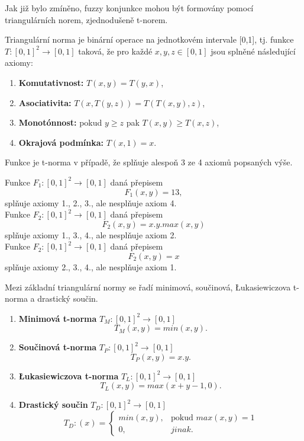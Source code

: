 Jak již bylo zmíněno, fuzzy konjunkce mohou být formovány pomocí triangulárních norem, zjednodušeně t-norem. 
\begin{definition}
\cite{hlinena}
    Triangulární norma je binární operace na jednotkovém intervale [0,1], tj. funkce $T: [0,1]^2 \rightarrow [0,1]$ taková, že pro každé $x, y, z \in [0,1]$ jsou splněné následující axiomy:
    \begin{enumerate}
        \item \textbf{Komutativnost:} $T(x,y) = T(y,x)$,
        \item \textbf{Asociativita:} $T(x, T(y, z)) = T(T(x, y), z)$,
        \item \textbf{Monotónnost:} pokud $y \geq z$ pak $T(x, y) \geq T(x, z)$,
        \item \textbf{Okrajová podmínka:} $T(x, 1) = x$.
    \end{enumerate}
\end{definition}

\begin{remark}
    Funkce je t-norma v případě, že spl\v nuje alespo\v n 3 ze 4 axiom\r u popsaných výše.
\end{remark}

\begin{example}
    Funkce $F_1 : [0, 1]^2 \rightarrow [0, 1]$ daná přepisem\\
    $$F_1(x,y) = 13,$$
    spl\v nuje axiomy 1., 2., 3., ale nespl\v nuje axiom 4.\\

    Funkce $F_2 : [0, 1]^2 \rightarrow [0, 1]$ daná přepisem\\
    $$F_2(x,y) = x.y.max(x,y)$$
    spl\v nuje axiomy 1., 3., 4., ale nespl\v nuje axiom 2.\\

    Funkce $F_2 : [0, 1]^2 \rightarrow [0, 1]$ daná přepisem\\
    $$F_2(x,y) = x$$
    spl\v nuje axiomy 2., 3., 4., ale nespl\v nuje axiom 1.\\
    
\end{example}

Mezi základní triangulární normy se řadí minimová, součinová, Łukasiewiczova t-norma a drastický součin.
\begin{definition}
\cite{hlinena}
    \begin{enumerate}
    \item \textbf{Minimová t-norma} $T_M: [0,1]^2 \rightarrow [0,1]$
    $$T_M(x,y) = min(x,y).$$
    \item \textbf{Součinová t-norma} $T_P: [0,1]^2 \rightarrow [0,1]$
    $$T_P(x,y) = x.y.$$
    \item \textbf{Łukasiewiczova t-norma} $T_L: [0,1]^2 \rightarrow [0,1]$
    $$T_L(x,y) = max(x+y-1,0).$$
    \item \textbf{Drastický součin} $T_D: [0,1]^2 \rightarrow [0,1]$
    $$T_D:(x)=\begin{cases} min(x,y), & \mbox{pokud }  max(x,y) = 1\\ 
    0, &  jinak.  \end{cases}$$
\end{enumerate}
\end{definition}

